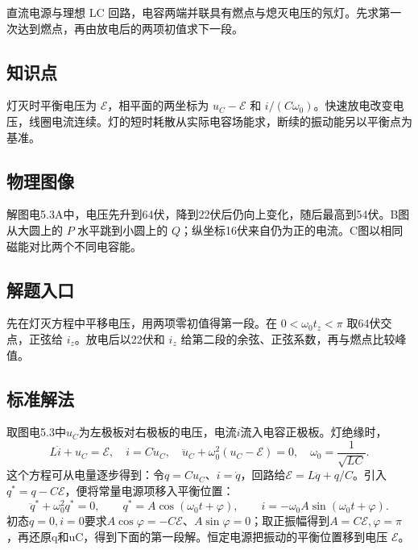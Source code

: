\documentclass[UTF8,fontset=fandol,a4paper,11pt]{ctexart}
\begin{document}
直流电源与理想 LC 回路，电容两端并联具有燃点与熄灭电压的氖灯。先求第一次达到燃点，再由放电后的两项初值求下一段。



\subsection*{知识点}

灯灭时平衡电压为 $\mathcal E$，相平面的两坐标为 $u_C-\mathcal E$ 和 $i/(C\omega_0)$。快速放电改变电压，线圈电流连续。灯的短时耗散从实际电容场能求，断续的振动能另以平衡点为基准。



\subsection*{物理图像}

解图电5.3A中，电压先升到64伏，降到22伏后仍向上变化，随后最高到54伏。B图从大圆上的 $P$ 水平跳到小圆上的 $Q$；纵坐标16伏来自仍为正的电流。C图以相同磁能对比两个不同电容能。



\subsection*{解题入口}

先在灯灭方程中平移电压，用两项零初值得第一段。在 $0<\omega_0t_z<\pi$ 取64伏交点，正弦给 $i_z$。放电后以22伏和 $i_z$ 给第二段的余弦、正弦系数，再与燃点比较峰值。


\subsection*{标准解法}


取图电5.3中$u_C$为左极板对右极板的电压，电流$i$流入电容正极板。灯绝缘时，
\[
 L\dot i+u_C=\mathcal E,\quad i=C\dot u_C,\quad
 \ddot u_C+\omega_0^2(u_C-\mathcal E)=0,\quad\omega_0=\frac1{\sqrt{LC}}.
\]
这个方程可从电量逐步得到：令$q=Cu_C$、$i=\dot q$，回路给$\mathcal E=L\ddot q+q/C$。引入$q^*=q-C\mathcal E$，便将常量电源项移入平衡位置：
\[
\ddot q^*+\omega_0^2q^*=0,\qquad
q^*=A\cos(\omega_0t+\varphi),\qquad
i=-\omega_0A\sin(\omega_0t+\varphi).
\]
初态$q=0,i=0$要求$A\cos\varphi=-C\mathcal E$、$A\sin\varphi=0$；取正振幅得到$A=C\mathcal E,\varphi=\pi$，再还原q和uC，得到下面的第一段解。恒定电源把振动的平衡位置移到电压 $\mathcal E$。
\end{document}
